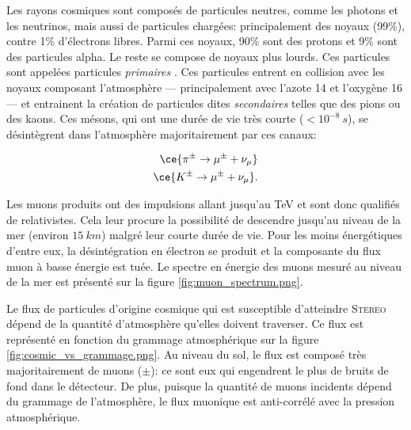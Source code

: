 Les rayons cosmiques sont composés de particules neutres, comme les photons et les neutrinos, mais aussi de particules chargées: principalement des noyaux (99\%), contre 1\% d'électrons libres. Parmi ces noyaux, 90\% sont des protons et 9\% sont des particules alpha. Le reste se compose de noyaux plus lourds. Ces particules sont appelées particules \og \textit{primaires} \fg{}. Ces particules entrent en collision avec les noyaux composant l'atmosphère --- principalement avec l'azote 14 et l'oxygène 16 --- et entrainent la création de particules dites \og \textit{secondaires} \fg{} telles que des pions ou des kaons. Ces mésons, qui ont une durée de vie très courte ($< 10^{-8}\SI{}{s}$), se désintègrent dans l'atmosphère majoritairement par ces canaux:

\begin{align}
    \ce{\pi^{\pm} \rightarrow \mu^{\pm} + \nu_{\mu}}\\
    \ce{K^{\pm} \rightarrow \mu^{\pm} + \nu_{\mu}}.
\end{align}

\bigbreak

Les muons produits ont des impulsions allant jusqu'au TeV et sont donc qualifiés de relativistes. Cela leur procure la possibilité de descendre jusqu'au niveau de la mer (environ $\SI{15}{km}$) malgré leur courte durée de vie. Pour les moins énergétiques d'entre eux, la désintégration en électron se produit et la composante du flux muon à basse énergie est tuée. Le spectre en énergie des muons mesuré au niveau de la mer est présenté sur la figure \ref{fig:muon_spectrum.png}.

\bigbreak

Le flux de particules d'origine cosmique qui est susceptible d'atteindre \textsc{Stereo} dépend de la quantité d'atmosphère qu'elles doivent traverser. Ce flux est représenté en fonction du grammage atmosphérique sur la figure \ref{fig:cosmic_vs_grammage.png}. Au niveau du sol, le flux est composé très majoritairement de muons ($\pm$): ce sont eux qui engendrent le plus de bruits de fond dans le détecteur. De plus, puisque la quantité de muons incidents dépend du grammage de l'atmosphère, le flux muonique est anti-corrélé avec la pression atmosphérique.\\


